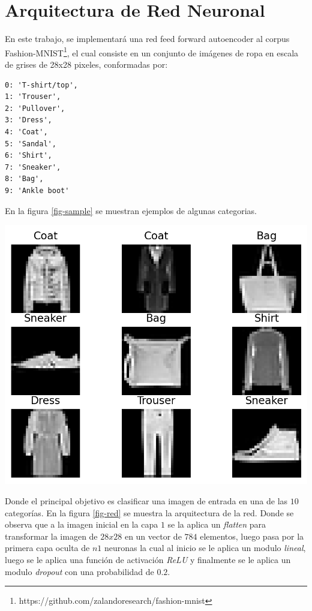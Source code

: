 \documentclass[aps,prl,reprint,groupedaddress]{revtex4-2}
\newenvironment{Figura}
  {\par\medskip\noindent\minipage{\linewidth}}
  {\endminipage\par\medskip}
\begin{document}
\section{Arquitectura de Red Neuronal}
En este trabajo, se implementará una red feed forward autoencoder al corpus 
Fashion-MNIST\footnote{https://github.com/zalandoresearch/fashion-mnist}, el cual consiste en un conjunto de imágenes de ropa en escala de
grises de 28x28 pixeles, conformadas por:
\begin{verbatim}
0: 'T-shirt/top',
1: 'Trouser',
2: 'Pullover',
3: 'Dress',
4: 'Coat',
5: 'Sandal',
6: 'Shirt',
7: 'Sneaker',
8: 'Bag',
9: 'Ankle boot'
\end{verbatim}

En la figura \ref{fig-sample} se muestran ejemplos de algunas categorias.
\begin{Figura}
  \centering
  \includegraphics[width=1\textwidth]{figs/sample.png}
  \label{fig-sample}
\end{Figura}

Donde el principal objetivo es clasificar una imagen de entrada en una de las 
$10$ categorías. En la figura \ref{fig-red} se muestra la arquitectura de la red.
Donde se observa que a la imagen inicial en la capa $1$ se la aplica un 
\textit{flatten} para transformar la imagen de $28x28$ en un vector de $784$ 
elementos, luego pasa por la primera capa oculta de $n1$ neuronas la cual al 
inicio se le aplica un modulo \textit{lineal}, luego se le aplica una función 
de activación \textit{ReLU} y finalmente se le aplica un modulo \textit{dropout} 
con una probabilidad de $0.2$.
\end{document}
